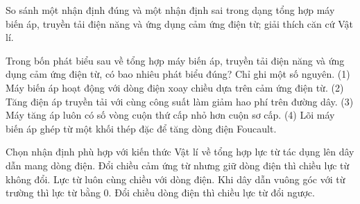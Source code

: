 \begin{bt}
So sánh một nhận định đúng và một nhận định sai trong dạng tổng hợp máy biến áp, truyền tải điện năng và ứng dụng cảm ứng điện từ; giải thích căn cứ Vật lí.
\end{bt}

\begin{ex}
Trong bốn phát biểu sau về tổng hợp máy biến áp, truyền tải điện năng và ứng dụng cảm ứng điện từ, có bao nhiêu phát biểu đúng? Chỉ ghi một số nguyên. (1) Máy biến áp hoạt động với dòng điện xoay chiều dựa trên cảm ứng điện từ. (2) Tăng điện áp truyền tải với cùng công suất làm giảm hao phí trên đường dây. (3) Máy tăng áp luôn có số vòng cuộn thứ cấp nhỏ hơn cuộn sơ cấp. (4) Lõi máy biến áp ghép từ một khối thép đặc để tăng dòng điện Foucault.
\end{ex}

\begin{ex}
Chọn nhận định phù hợp với kiến thức Vật lí về tổng hợp lực từ tác dụng lên dây dẫn mang dòng điện.
\choice
{Đổi chiều cảm ứng từ nhưng giữ dòng điện thì chiều lực từ không đổi.}
{Lực từ luôn cùng chiều với dòng điện.}
{Khi dây dẫn vuông góc với từ trường thì lực từ bằng 0.}
{\True Đổi chiều dòng điện thì chiều lực từ đổi ngược.}
\end{ex}

